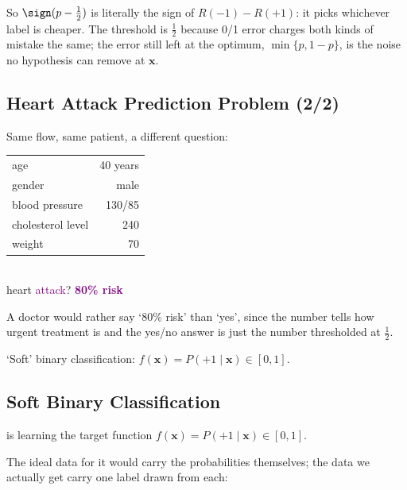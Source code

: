 So \(\sign(p - \frac{1}{2})\) is literally the sign of \(R(-1) - R(+1)\): it
picks whichever label is cheaper. The threshold is \(\frac{1}{2}\) because 0/1
error charges both kinds of mistake the same; the error still left at the
optimum, \(\min\{p, 1 - p\}\), is the noise no hypothesis can remove at
\(\bm{x}\).

\subsection{Heart Attack Prediction Problem (2/2)}

Same flow, same patient, a different question:

\begin{center}
    \small
    \begin{tabular}{@{}|l|r|@{}}
        \hline
        age & 40 years\\
        gender & male\\
        blood pressure & 130/85\\
        cholesterol level & 240\\
        weight & 70\\
        \hline
    \end{tabular}\\[4pt]
    heart \textcolor{Purple}{attack}? \textbf{\textcolor{Purple}{80\% risk}}
\end{center}

A doctor would rather say `80\% risk' than `yes', since the number tells how
urgent treatment is and the yes/no answer is just the number thresholded at
\(\frac{1}{2}\).

\begin{moral}
    `Soft' binary classification: \(f(\bm{x}) = P(+1 \mid \bm{x}) \in [0,
    1]\).
\end{moral}

\subsection{Soft Binary Classification}

\begin{definition}\label{def:soft-binary}
     is learning the target function
    \(f(\bm{x}) = P(+1 \mid \bm{x}) \in [0, 1]\).
\end{definition}

The ideal data for it would carry the probabilities themselves; the data we
actually get carry one label drawn from each:

